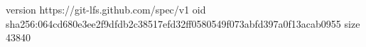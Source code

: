 version https://git-lfs.github.com/spec/v1
oid sha256:064cd680e3ee2f9dfdb2c38517efd32ff0580549f073abfd397a0f13acab0955
size 43840
